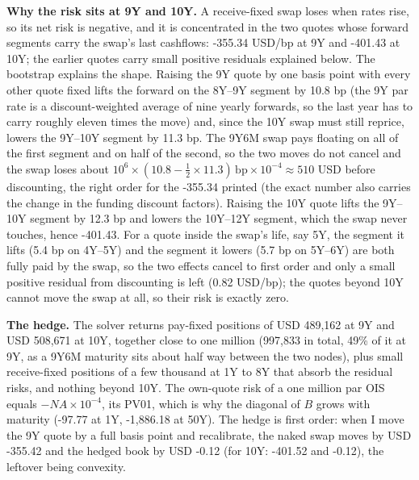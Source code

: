 \documentclass[10pt]{article}
\begin{document}
\textbf{Why the risk sits at 9Y and 10Y.} A receive-fixed swap loses when rates rise, so its net risk is negative, and it is
concentrated in the two quotes whose forward segments carry the swap's last cashflows: -355.34 USD/bp at 9Y and -401.43 at 10Y; the
earlier quotes carry small positive residuals explained below.
The bootstrap explains the shape. Raising the 9Y quote by one basis point with every other quote fixed lifts the forward on the
8Y--9Y segment by 10.8 bp (the 9Y par rate is a discount-weighted average of nine yearly forwards, so the last year has to carry
roughly eleven times the move) and, since the 10Y swap must still
reprice, lowers the 9Y--10Y segment by 11.3 bp. The 9Y6M swap pays floating on all of the first segment and on half of the
second, so the two moves do not cancel and the swap loses about $10^6\times(\text{10.8}-\tfrac12\times\text{11.3})\,\text{bp}
\times 10^{-4}\approx 510$ USD before discounting, the right order for the -355.34 printed (the exact number also carries the change
in the funding discount factors). Raising the 10Y quote lifts the 9Y--10Y segment by 12.3 bp
and lowers the 10Y--12Y segment, which the swap never touches, hence -401.43. For a quote inside the swap's life, say 5Y, the
segment it lifts (5.4 bp on 4Y--5Y) and the segment it lowers (5.7 bp on 5Y--6Y) are both fully paid by the swap, so the two
effects cancel to first order and only a small positive residual from discounting is left (0.82 USD/bp); the quotes beyond 10Y
cannot move the swap at all, so their risk is exactly zero.

\textbf{The hedge.} The solver returns pay-fixed positions of USD 489,162 at 9Y and USD 508,671 at 10Y, together close to one million
(997,833 in total, 49\% of it at 9Y, as a 9Y6M maturity sits about half way between the two nodes), plus small receive-fixed
positions of a few thousand at 1Y to 8Y that absorb the residual risks, and nothing beyond 10Y. The own-quote risk of a one million
par OIS equals $-NA\times10^{-4}$, its PV01, which is why the diagonal of $B$ grows with maturity (-97.77 at 1Y, -1,886.18 at 50Y). The
hedge is first order: when I move the 9Y quote by a full basis point and recalibrate, the naked swap moves by USD -355.42 and the
hedged book by USD -0.12 (for 10Y: -401.52 and -0.12), the leftover being convexity.
\end{document}
